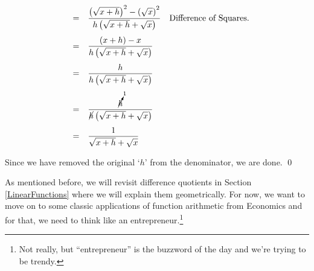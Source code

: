 \documentclass{ximera}
\begin{document}
\begin{example}
\begin{enumerate}
\[\begin{array}{rcll}
												 & = &  \dfrac{\left(\sqrt{x+h}\right)^2 - \left(\sqrt{x}\right)^2}{h\left(\sqrt{x+h} + \sqrt{x}\right)} & \text{Difference of Squares.}\\ [15pt]
												
												& = &  \dfrac{(x+h) - x}{h\left(\sqrt{x+h} + \sqrt{x}\right)} & \\ [15pt]
												
												 & = &  \dfrac{h}{h\left(\sqrt{x+h} + \sqrt{x}\right)} & \\ [15pt]
												 
												 												 & = &  \dfrac{\cancelto{1}{h}}{\cancel{h}\left(\sqrt{x+h} + \sqrt{x}\right)} & \\ [15pt]
										
										
												 & = &  \dfrac{1}{\sqrt{x+h} + \sqrt{x}} & \\ 
												\end{array}\]	


Since we have removed the original `$h$' from the denominator, we are done.  \qed

\end{enumerate}

\end{example}

\label{diffquotgeompromise}

As mentioned before, we will revisit difference quotients in Section \ref{LinearFunctions} where we will explain them geometrically.  For now, we want to move on to some classic applications of function arithmetic from Economics and for that, we need to think like an entrepreneur.\footnote{Not really, but ``entrepreneur'' is the buzzword of the day and we're trying to be trendy.}

\medskip
\end{document}
